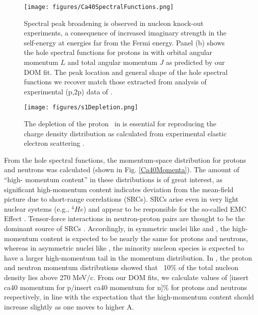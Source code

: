 \begin{figure}[ht!]
    \centering
    \texttt{[image: figures/Ca40SpectralFunctions.png]}
    \caption[Spectral peak broadening in \caForty: DOM prediction and experimental (p,2p) data]
    {
        Spectral peak broadening is observed in nucleon knock-out experiments, a 
        consequence of increased imaginary strength in the self-energy at energies far from the
        Fermi energy. Panel (b) shows the hole spectral functions for protons in \caForty
        with orbital angular momentum $L$ and total angular momentum $J$ as predicted by our DOM fit.
        The peak location and general shape of the hole spectral functions we recover match those
        extracted from analysis of experimental (p,2p) data of \cite{LiverpoolCa40}.
    }
    \label{s1Depletion}
\end{figure}

\begin{figure}[ht!]
    \centering
    \texttt{[image: figures/s1Depletion.png]}
    \caption[Depletion of proton \sOne\ in \caForty essential to reproduce charge density
    distribution]
    {
        The depletion of the proton \sOne\ in \caForty is essential
        for reproducing the charge density
        distribution as calculated from experimental elastic electron scattering \cite{DeVries}.
    }
    \label{s1Depletion}
\end{figure}

From the hole spectral functions, the momentum-space distribution for protons and neutrons was
calculated (shown in Fig. \ref{Ca40Momenta}). The amount of ``high-
momentum content'' in these distributions is of great interest, as significant high-momentum content 
indicates deviation from the mean-field picture due to short-range correlations (SRCs). SRCs arise 
even in very light nuclear systems (e.g., $^{4}He$)
and appear to be responsible for the so-called EMC Effect \cite{PRC_85_047301_OHen, 
PRC_86_065204_Arrington, CLAS2019}.
Tensor-force 
interactions in neutron-proton pairs are thought to be the dominant source of 
SRCs \cite{Subedi2008}. Accordingly, in symmetric nuclei like \cTwelve and \caForty, the
high-momentum content is expected to be nearly the same for protons and neutrons, whereas in
asymmetric nuclei like \pbEight, the minority nucleon species is expected to have a larger
high-momentum tail in the momentum distribution. In \cite{C12HighMomentum}, the \cTwelve proton and
neutron momentum distributions showed that ~10\% of the total nucleon density lies above 270 MeV/c.
From our DOM fits, we calculate values of [insert ca40 momentum for p/insert ca40 momentum for n]\%
for protons and neutrons respectively, in line with the expectation that the high-momentum content
should increase slightly as one moves to higher A.

